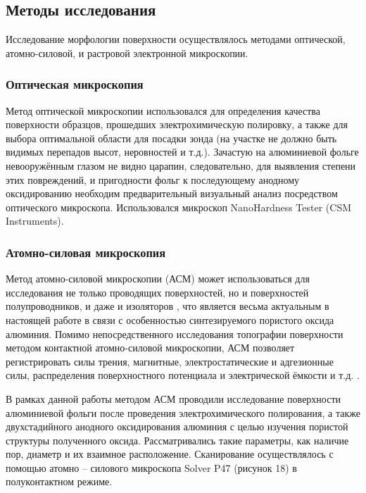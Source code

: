 \subsection{Методы исследования}

Исследование морфологии поверхности осуществлялось методами оптической, атомно-силовой, и растровой электронной микроскопии.

\subsubsection{Оптическая микроскопия}

Метод оптической микроскопии использовался для определения качества поверхности образцов, прошедших электрохимическую полировку, а также для выбора оптимальной области для посадки зонда (на участке не должно быть видимых перепадов высот, неровностей и т.д.). Зачастую на алюминиевой фольге невооружённым глазом не видно царапин, следовательно, для выявления степени этих повреждений, и пригодности фольг к последующему анодному оксидированию необходим предварительный визуальный анализ посредством оптического микроскопа. Использовался микроскоп NanoHardness Tester (CSM Instruments).

\subsubsection{Атомно-силовая микроскопия}

Метод атомно-силовой микроскопии (АСМ) может использоваться для исследования не только проводящих поверхностей, но и поверхностей полупроводников, и даже и изоляторов \cite{kelcall}, что является весьма актуальным в настоящей работе в связи с особенностью синтезируемого пористого оксида алюминия. Помимо непосредственного исследования топографии поверхности методом контактной атомно-силовой микроскопии, АСМ позволяет регистрировать силы трения, магнитные, электростатические и адгезионные силы, распределения поверхностного потенциала и электрической ёмкости и т.д. \cite{eliseev-functsionalnie}.

В рамках данной работы методом АСМ проводили исследование поверхности алюминиевой фольги после проведения электрохимического полирования, а также двухстадийного анодного оксидирования алюминия с целью изучения пористой структуры полученного оксида. Рассматривались такие параметры, как наличие пор, диаметр и их взаимное расположение. Сканирование осуществлялось с помощью атомно – силового микроскопа Solver P47 (рисунок 18) в полуконтактном режиме.

